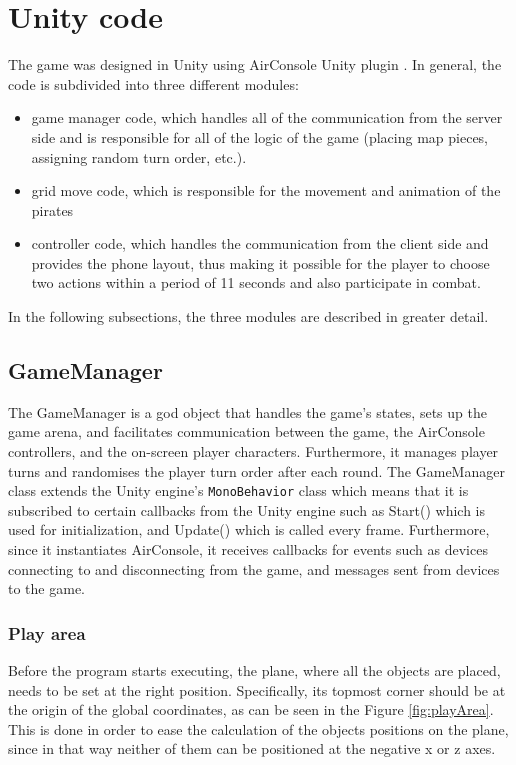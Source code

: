 \section{Unity code}
The game was designed in Unity using AirConsole Unity plugin \cite{AirconsoleUnity}. In general, the code is subdivided into three different modules: 
\begin{itemize}
	\item game manager code, which handles all of the communication from the server side and is responsible for all of the logic of the game (placing map pieces, assigning random turn order, etc.).
	\item grid move code, which is responsible for the movement and animation of the pirates
	\item controller code, which handles the communication from the client side and provides the phone layout, thus making it possible for the player to choose two actions within a period of 11 seconds and also participate in combat.
\end{itemize}

In the following subsections, the three modules are described in greater detail.

\subsection{GameManager}
The GameManager is a god object that handles the game’s states, sets up the game arena, and facilitates communication between the game, the AirConsole controllers, and the on-screen player characters. Furthermore, it manages player turns and randomises the player turn order after each round. The GameManager class extends the Unity engine’s \texttt{MonoBehavior} class which means that it is subscribed to certain callbacks from the Unity engine such as Start() which is used for initialization, and Update() which is called every frame. Furthermore, since it instantiates AirConsole, it receives callbacks for events such as devices connecting to and disconnecting from the game, and messages sent from devices to the game. 

\subsubsection{Play area}
Before the program starts executing, the plane, where all the objects are placed, needs to be set at the right position. Specifically, its topmost corner should be at the origin of the global coordinates, as can be seen in the Figure \ref{fig:playArea}. This is done in order to ease the calculation of the objects positions on the plane, since in that way neither of them can be positioned at the negative x or z axes.

